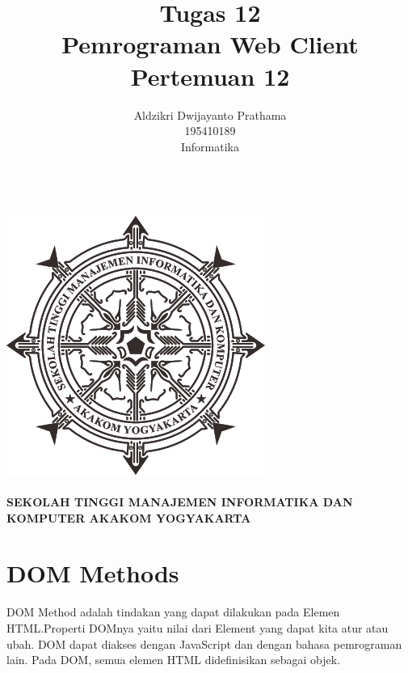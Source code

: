 \documentclass[a4paper,12pt]{article}
\begin{document}
\title{ {\Large Tugas 12}\\ Pemrograman Web Client\\{\Large Pertemuan 12}}

\author{Aldzikri Dwijayanto Prathama 
	\\195410189
	\\Informatika}
\makeatletter
\begin{titlepage}
	\begin{center}
		{\huge \bfseries \@title }\\[14ex]
		\includegraphics[scale=.8]{logo}\\[4ex]
		{\large \@author}\\[12ex]
		{\large \bfseries {SEKOLAH TINGGI MANAJEMEN INFORMATIKA DAN KOMPUTER
				AKAKOM YOGYAKARTA}}
	\end{center}


\end{titlepage}
\makeatother
\renewcommand{\figurename}{Gambar}
\newpage

\section*{DOM Methods}
DOM Method adalah tindakan yang dapat dilakukan pada Elemen HTML.\@ Properti DOMnya yaitu nilai dari Element yang dapat
kita atur atau ubah. DOM dapat diakses dengan JavaScript dan dengan bahasa pemrograman lain. Pada DOM, semua elemen HTML
didefinisikan sebagai objek.
\end{document}
